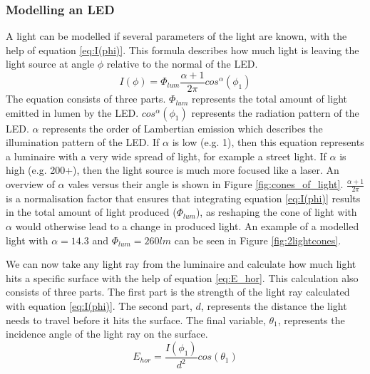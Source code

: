 \subsubsection{Modelling an LED}
A light can be modelled if several parameters of the light are known, with the help of equation \ref{eq:I(phi)}. This formula describes how much light is leaving the light source at angle $\phi$ relative to the normal of the LED.
\begin{equation}
\label{eq:I(phi)}
I(\phi)=\Phi_{lum}\frac{\alpha+1}{2\pi}cos^\alpha(\phi_1)
\end{equation}
The equation consists of three parts. $\Phi_{lum}$ represents the total amount of light emitted in lumen by the LED. $cos^\alpha(\phi_1)$ represents the radiation pattern of the LED. $\alpha$ represents the order of Lambertian emission which describes the illumination pattern of the LED. If $\alpha$ is low (e.g. 1), then this equation represents a luminaire with a very wide spread of light, for example a street light. If $\alpha$ is high (e.g. 200+), then the light source is much more focused like a laser. An overview of $\alpha$ vales versus their angle is shown in Figure \ref{fig:cones_of_light}. $\frac{\alpha+1}{2\pi}$ is a normalisation factor that ensures that integrating equation \ref{eq:I(phi)} results in the total amount of light produced ($\Phi_{lum}$), as reshaping the cone of light with $\alpha$ would otherwise lead to a change in produced light. An example of a modelled light with $\alpha = 14.3$ and $\Phi_{lum} = 260lm$ can be seen in Figure \ref{fig:2lightcones}.

We can now take any light ray from the luminaire and calculate how much light hits a specific surface with the help of equation \ref{eq:E_hor}. This calculation also consists of three parts. The first part is the strength of the light ray calculated with equation \ref{eq:I(phi)}. The second part, $d$, represents the distance the light needs to travel before it hits the surface. The final variable, $\theta_1$, represents the incidence angle of the light ray on the surface.
\begin{equation}
\label{eq:E_hor}
E_{hor} = \frac{I(\phi_1)}{d^2} cos(\theta_1)
\end{equation}


